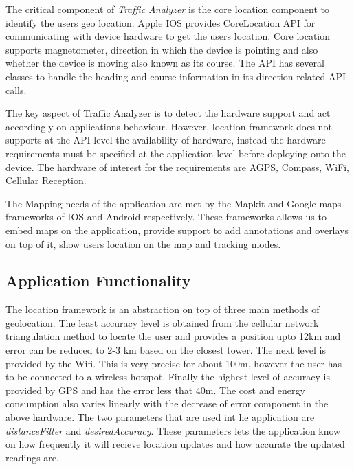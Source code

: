 \documentclass[10pt]{sigplan-proc-varsize}
\begin{document}
The critical component of \textit{Traffic Analyzer} is the core location component to identify the users geo location. Apple IOS provides CoreLocation API for communicating with device hardware to get the users location. Core location supports magnetometer, direction in which the device is pointing and also whether the device is moving also known as its course. The API has several classes to handle the heading and course information in its direction-related API calls.

The key aspect of Traffic Analyzer is to detect the hardware support and act accordingly on applications behaviour. However, location framework does not supports at the API level the availability of hardware, instead the hardware requirements must be specified at the application level before deploying onto the device. The hardware of interest for the requirements are AGPS, Compass, WiFi, Cellular Reception.

The Mapping needs of the application are met by the Mapkit and Google maps frameworks of IOS and Android respectively. These frameworks allows us to embed maps on the application, provide support to add annotations and overlays on top of it, show users location on the map and tracking modes.

\subsection{Application Functionality}
The location framework is an abstraction on top of three main methods of geolocation. The least accuracy level is obtained from the cellular network triangulation method to locate the user and provides a position upto 12km and error can be reduced to 2-3 km based on the closest tower. The next level is provided by the Wifi. This is very precise for about 100m, however the user has to be connected to a wireless hotspot. Finally the highest level of accuracy is provided by GPS and has the error less that 40m. The cost and energy consumption also varies linearly with the decrease of error component in the above hardware. The two parameters that are used int he application are \textit{distanceFilter} and \textit{desiredAccuracy}. These parameters lets the application know on how frequently it will recieve location updates and how accurate the updated readings are.
\end{document}
